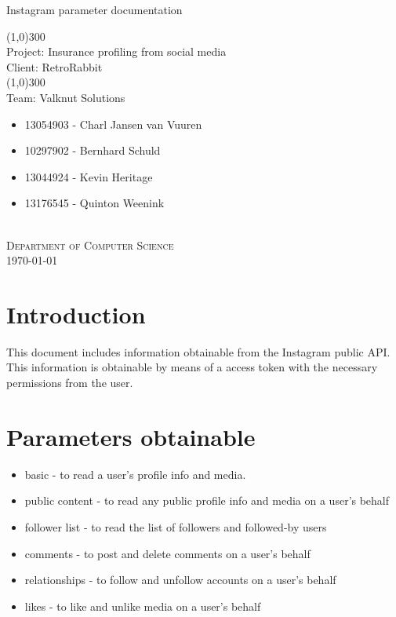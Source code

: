 \documentclass{article}
\begin{document}
	\begin{titlepage}
		\begin{center}
		
			\huge{
			Instagram parameter documentation\\
			}
			
			\line(1,0){300}\\
			[0.2cm]
			\LARGE{Project: Insurance profiling from social media\\
			Client: RetroRabbit} \\
			\line(1,0){300}\\
			\LARGE{Team: Valknut Solutions}\\
			[1.0cm]
			\large
			{
			\begin{itemize}
				\item 13054903 - Charl Jansen van Vuuren 
				\item 10297902 - Bernhard Schuld      
				\item 13044924 - Kevin Heritage
				\item 13176545 - Quinton Weenink\\
			\end{itemize}
			}
			\textsc{\large}\\
		[3.0cm]
		\textsc{\large  Department of Computer Science}\\
		[0.5cm]
		\textsc{\large \today}\\
		\end{center}

	\end{titlepage}
	\cleardoublepage
	\tableofcontents
	\cleardoublepage

\section{Introduction}
This document includes information obtainable from the Instagram public API. This information is obtainable by means of a access token with the necessary permissions from the user.
\section{Parameters obtainable}
\begin{itemize}
	\item basic - to read a user’s profile info and media.
	\item public content - to read any public profile info and media on a user’s behalf
	\item follower list - to read the list of followers and followed-by users
	\item comments - to post and delete comments on a user’s behalf
	\item relationships - to follow and unfollow accounts on a user’s behalf
	\item likes - to like and unlike media on a user’s behalf
\end{itemize}
\end{document}
